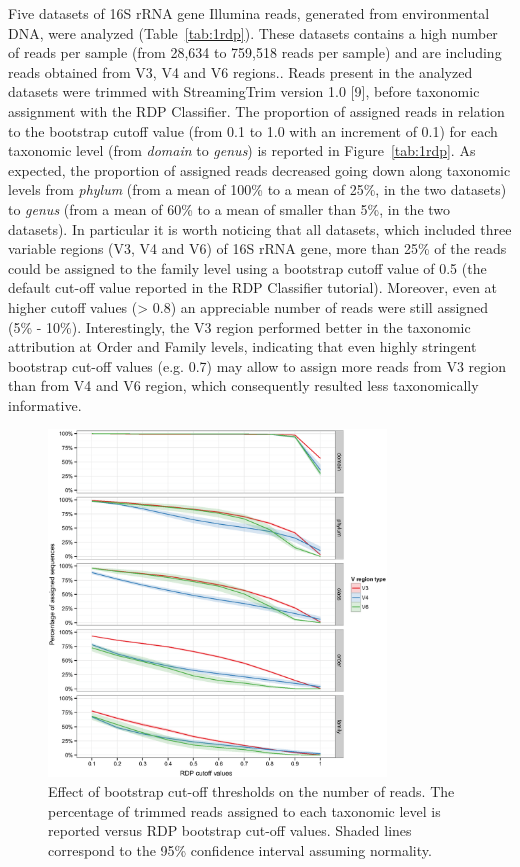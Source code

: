 Five datasets of 16S rRNA gene Illumina reads, generated from environmental DNA, were analyzed (Table~\ref{tab:1rdp}). These datasets contains a high number of reads per sample (from 28,634 to 759,518 reads per sample) and are including reads obtained from V3, V4 and V6 regions.. Reads present in the analyzed datasets were trimmed with StreamingTrim version 1.0 [9], before taxonomic assignment with the RDP Classifier. The proportion of assigned reads in relation to the bootstrap cutoff value (from 0.1 to 1.0 with an increment of 0.1) for each taxonomic level (from \textit{domain} to \textit{genus}) is reported in Figure~\ref{tab:1rdp}. As expected, the proportion of assigned reads decreased going down along taxonomic levels from \textit{phylum} (from a mean of 100\% to a mean of 25\%, in the two datasets) to \textit{genus} (from a mean of 60\% to a mean of smaller than 5\%, in the two datasets). In particular it is worth noticing that all datasets, which included three variable regions (V3, V4 and V6) of 16S rRNA gene, more than 25\% of the reads could be assigned to the family level using a bootstrap cutoff value of 0.5 (the default cut-off value reported in the RDP Classifier tutorial). Moreover, even at higher cutoff values ({\textgreater} 0.8) an appreciable number of reads were still assigned (5\% - 10\%). Interestingly, the V3 region performed better in the taxonomic attribution at Order and Family levels, indicating that even highly stringent bootstrap cut-off values (e.g. 0.7) may allow to assign more reads from V3 region than from V4 and V6 region, which consequently resulted less taxonomically informative.\\
\begin{figure}[!tb]
	\centering
	\includegraphics[width=0.8\textwidth]{./figures/Chapter_2/Figure_1}
  	\caption{\label{fig:1rdp}Effect of bootstrap cut-off thresholds on the number of reads. The percentage of trimmed reads assigned to each taxonomic level is reported versus RDP bootstrap cut-off values. Shaded lines correspond to the 95\% confidence interval assuming normality.}
\end{figure}
